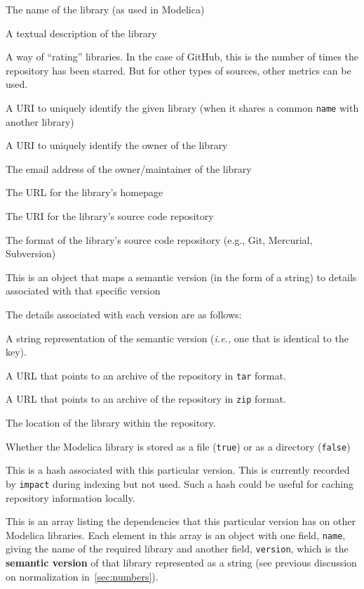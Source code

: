 \documentclass[11pt,a4paper,twocolumn]{article}
\newcommand{\code}[1]{\texttt{#1}} %
\begin{document}
\begin{description}[noitemsep]
  \item[\code{name}] The name of the library (as used in Modelica)
  \item[\code{description}] A textual description of the library
  \item[\code{stars}] A way of ``rating'' libraries.  In the case of
    GitHub, this is the number of times the repository has been starred.
    But for other types of sources, other metrics can be used.
  \item[\code{uri}] A URI to uniquely identify the given library (when
    it shares a common \code{name} with another library)
  \item[\code{owner\_uri}] A URI to uniquely identify the owner of the
    library
  \item[\code{email}] The email address of the owner/maintainer of the
    library
  \item[\code{homepage}] The URL for the library's homepage
  \item[\code{repository}] The URI for the library's source code
    repository
  \item[\code{format}] The format of the library's source code
    repository (e.g., Git, Mercurial, Subversion)
  \item[\code{versions}] This is an object that maps a semantic
    version (in the form of a string) to details associated with that
    specific version
\end{description}

The details associated with each version are as follows:

\begin{description}[noitemsep]
  \item[\code{version}] A string representation of the semantic
    version (\emph{i.e.,} one that is identical to the key).
  \item[\code{tarball\_url}] A URL that points to an archive of the
    repository in \code{tar} format.
  \item[\code{zipball\_url}] A URL that points to an archive of the
    repository in \code{zip} format.
  \item[\code{path}] The location of the library within the
    repository.
  \item[\code{isfile}] Whether the Modelica library is stored as a
    file (\code{true}) or as a directory (\code{false})
  \item[\code{sha}] This is a hash associated with this particular
    version.  This is currently recorded by \code{impact} during
    indexing but not used.  Such a hash could be useful for caching
    repository information locally.
  \item[\code{dependencies}] This is an array listing the dependencies
    that this particular version has on other Modelica libraries.
    Each element in this array is an object with one field,
    \code{name}, giving the name of the required library and another
    field, \code{version}, which is the \textbf{semantic version} of that
    library represented as a string (see previous discussion on
    normalization in~\ref{sec:numbers}).
\end{description}
\end{document}
